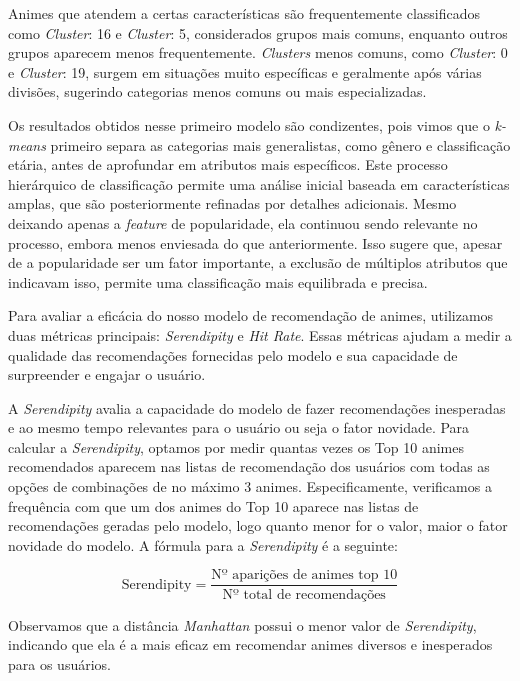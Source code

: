 \documentclass[twocolumn]{rbef}
\newcommand{\1}{\mathbbm{1}}
\begin{document}
Animes que atendem a certas características são frequentemente classificados como \textit{Cluster}: 16 e \textit{Cluster}: 5, considerados grupos mais comuns, enquanto outros grupos aparecem menos frequentemente. \textit{Clusters} menos comuns, como \textit{Cluster}: 0 e \textit{Cluster}: 19, surgem em situações muito específicas e geralmente após várias divisões, sugerindo categorias menos comuns ou mais especializadas.

Os resultados obtidos nesse primeiro modelo são condizentes, pois vimos que o \textit{k-means} primeiro separa as categorias mais generalistas, como gênero e classificação etária, antes de aprofundar em atributos mais específicos. Este processo hierárquico de classificação permite uma análise inicial baseada em características amplas, que são posteriormente refinadas por detalhes adicionais. Mesmo deixando apenas a \textit{feature} de popularidade, ela continuou sendo relevante no processo, embora menos enviesada do que anteriormente. Isso sugere que, apesar de a popularidade ser um fator importante, a exclusão de múltiplos atributos que indicavam isso, permite uma classificação mais equilibrada e precisa.

Para avaliar a eficácia do nosso modelo de recomendação de animes, utilizamos duas métricas principais: \textit{Serendipity} e \textit{Hit Rate}. Essas métricas ajudam a medir a qualidade das recomendações fornecidas pelo modelo e sua capacidade de surpreender e engajar o usuário.

A \textit{Serendipity} avalia a capacidade do modelo de fazer recomendações inesperadas e ao mesmo tempo relevantes para o usuário \cite{Ziarani} ou seja o fator novidade. Para calcular a \textit{Serendipity}, optamos por medir quantas vezes os Top 10 animes recomendados aparecem nas listas de recomendação dos usuários com todas as opções de combinações de no máximo 3 animes. Especificamente, verificamos a frequência com que um dos animes do Top 10 aparece nas listas de recomendações geradas pelo modelo, logo quanto menor for o valor, maior o fator novidade do modelo. A fórmula para a \textit{Serendipity} é a seguinte:

\begin{equation}
\text{Serendipity} = \frac{\text{Nº aparições de animes top 10}}{\text{Nº total de recomendações}}
\end{equation}

Observamos que a distância \textit{Manhattan} possui o menor valor de \textit{Serendipity}, indicando que ela é a mais eficaz em recomendar animes diversos e inesperados para os usuários.
\end{document}
